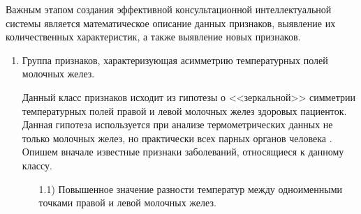 Важным этапом создания эффективной консультационной
интеллектуальной системы является математическое описание данных
признаков, выявление их количественных характеристик, а также
выявление новых признаков.

\begin{enumerate}
    \item Группа признаков, характеризующая асимметрию температурных полей молочных желез.

Данный класс признаков исходит из гипотезы о <<зеркальной>> симметрии температурных полей правой и левой молочных желез
здоровых пациенток. Данная гипотеза используется при анализе
термометрических данных не только молочных желез, но практически
всех парных органов человека \cite{losevhoperskov}. Опишем вначале
известные признаки заболеваний, относящиеся к данному классу.
    \begin{enumerate}
        \item[1.1)] Повышенное значение разности температур между одноименными точками правой и
        левой молочных желез.


\end{enumerate}
\end{enumerate}
